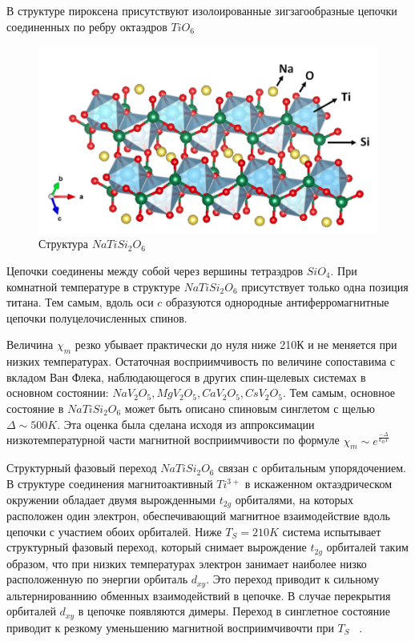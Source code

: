 \documentclass[11pt]{article}
\begin{document}
В структуре пироксена присутствуют изолоированные зигзагообразные цепочки соединенных по ребру октаэдров $TiO_6$

\begin{figure}[htp]
\centering
\includegraphics[scale=0.4]{NaTiSi2O6}
\caption {Структура $NaTiSi_2O_6$  ~\cite{Feiguin2019}}
\label{}
\end{figure}

Цепочки соединены между собой через вершины тетраэдров $SiO_4$. При комнатной температуре в структуре $NaTiSi_2O_6$ присутствует только одна позиция титана. Тем самым, вдоль оси $c$ образуются однородные антиферромагнитные цепочки полуцелочисленных спинов.

Величина $\chi_m$ резко убывает практически до нуля ниже 210К и не меняется при низких температурах. Остаточная восприимчивость по величине сопоставима с вкладом Ван Флека, наблюдающегося в других спин-щелевых системах в основном состоянии: $NaV_2O_5, MgV_2O_5, CaV_2O_5, CsV_2O_5$. Тем самым, основное состояние в $NaTiSi_2O_6$ может быть описано спиновым синглетом с щелью $\Delta \sim 500K$. Эта оценка была сделана исходя из аппроксимации низкотемпературной части магнитной восприимчивости по формуле $\chi_m \sim e^{\frac{-\Delta}{k_BT}}$

Структурный фазовый переход $NaTiSi_2O_6$ связан с орбитальным упорядочением. В структуре соединения магнитоактивный $Ti^{3+}$ в искаженном октаэдрическом окружении обладает двумя вырожденными $t_{2g}$ орбиталями, на которых расположен один электрон, обеспечивающий магнитное взаимодействие вдоль цепочки с участием обоих орбиталей. Ниже $T_S = 210K$ система испытывает структурный фазовый переход, который снимает вырождение $t_{2g}$ орбиталей таким образом, что при низких температурах электрон занимает наиболее низко расположенную по энергии орбиталь $d_{xy}$. Это переход приводит к сильному альтернированнию обменных взаимодействий в цепочке. В случае перекрытия орбиталей $d_{xy}$ в цепочке появляются димеры. Переход в синглетное состояние приводит к резкому уменьшению магнитной восприимчивочти при $T_S$ ~\cite{nm}.
\end{document}
